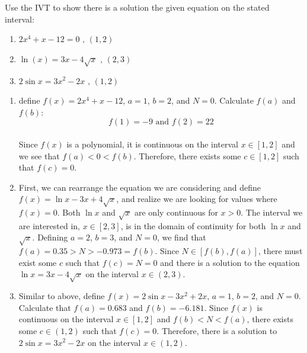 \begin{Exercise}
    [title=Intermediate Value Theorem Practice, label=IVTPrac]
    Use the IVT to show there is a solution the given equation on the stated 
    interval:\
    \begin{enumerate}
        \item $2x^4+x-12=0 \text{ , } \left(1, 2\right)$
        \item $\ln(x)=3x-4\sqrt{x}\text{ , } \left(2, 3\right)$
        \item $2\sin{x} = 3x^2-2x\text{ , } \left(1, 2\right)$
        \vspace{75mm}
    \end{enumerate}
\end{Exercise}
\begin{Answer}
    [ref=IVTPrac]
    \begin{enumerate}
        \item define $f(x)=2x^4+x-12$, $a=1$, $b=2$, and $N=0$. Calculate 
        $f(a)$ and $f(b)$:
        $$f(1)=-9 \text{ and } f(2)=22$$ \\
        Since $f(x)$ is a polynomial, it is continuous on the interval $x\in
        \left[1, 2\right]$ and we see that $f(a) < 0 < f(b)$. Therefore, there 
        exists some $c \in \left[1, 2\right]$ such that $f(c)=0$.\
        
        \item First, we can rearrange the equation we are considering and 
        define $f(x) = \ln{x} - 3x + 4\sqrt{x}$, and realize we are looking for 
        values where $f(x) = 0$. Both $\ln{x}$ and $\sqrt{x}$ are only continuous 
        for $x > 0$. The interval we are interested in, $x \in \left[2, 
        3\right]$, is in the domain of continuity for both $\ln{x}$ and 
        $\sqrt{x}$. Defining $a = 2$, $b = 3$, and $N = 0$, we find that $f(a) 
        = 0.35 > N > -0.973 = f(b)$. Since $N \in \left[f(b), f(a)\right]$, 
        there must exist some $c$ such that $f(c) = N = 0$ and there is a 
        solution to the equation $\ln{x} = 3x - 4\sqrt{x}$ on the interval $x 
        \in \left(2, 3\right)$.
        
        \item Similar to above, define $f(x) = 2\sin{x} - 3x^2 + 2x$, $a = 1$, 
        $b = 2$, and $N = 0$. Calculate that $f(a) = 0.683$ and $f(b) = -6.181$. 
        Since $f(x)$ is continuous on the interval $ x \in \left[1, 2\right]$ 
        and $f(b) < N < f(a)$, there exists some $c \in \left(1, 2 \right)$ 
        such that $f(c) = 0$. Therefore, there is a solution to $2\sin{x} =
        3x^2 - 2x$ on the interval $ x\in \left(1, 2\right)$.
    \end{enumerate}
\end{Answer}

